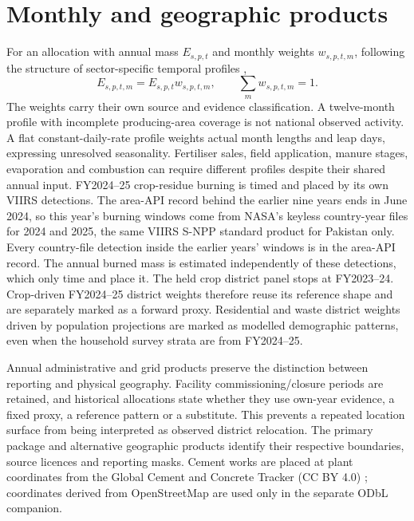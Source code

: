 \documentclass[essd]{copernicus}
\begin{document}
\section{Monthly and geographic products}
For an allocation with annual mass $E_{s,p,t}$ and monthly weights $w_{s,p,t,m}$, following the structure of sector-specific temporal profiles \citep{Crippa2020},
\begin{equation}
 E_{s,p,t,m}=E_{s,p,t}w_{s,p,t,m},\qquad \sum_m w_{s,p,t,m}=1.
 \label{eq:monthly}
\end{equation}
The weights carry their own source and evidence classification. A twelve-month profile with incomplete producing-area coverage is not national observed activity. A flat constant-daily-rate profile weights actual month lengths and leap days, expressing unresolved seasonality. Fertiliser sales, field application, manure stages, evaporation and combustion can require different profiles despite their shared annual input.
FY2024--25 crop-residue burning is timed and placed by its own VIIRS detections. The area-API record behind the earlier nine years ends in June 2024, so this year's burning windows come from NASA's keyless country-year files for 2024 and 2025, the same VIIRS S-NPP standard product for Pakistan only. Every country-file detection inside the earlier years' windows is in the area-API record. The annual burned mass is estimated independently of these detections, which only time and place it.
The held crop district panel stops at FY2023--24. Crop-driven FY2024--25 district weights therefore reuse its reference shape and are separately marked as a forward proxy. Residential and waste district weights driven by population projections are marked as modelled demographic patterns, even when the household survey strata are from FY2024--25.

Annual administrative and grid products preserve the distinction between reporting and physical geography. Facility commissioning/closure periods are retained, and historical allocations state whether they use own-year evidence, a fixed proxy, a reference pattern or a substitute. This prevents a repeated location surface from being interpreted as observed district relocation. The primary package and alternative geographic products identify their respective boundaries, source licences and reporting masks. Cement works are placed at plant coordinates from the Global Cement and Concrete Tracker (CC BY 4.0) \citep{GEMCement2026}; coordinates derived from OpenStreetMap are used only in the separate ODbL companion.
\end{document}

